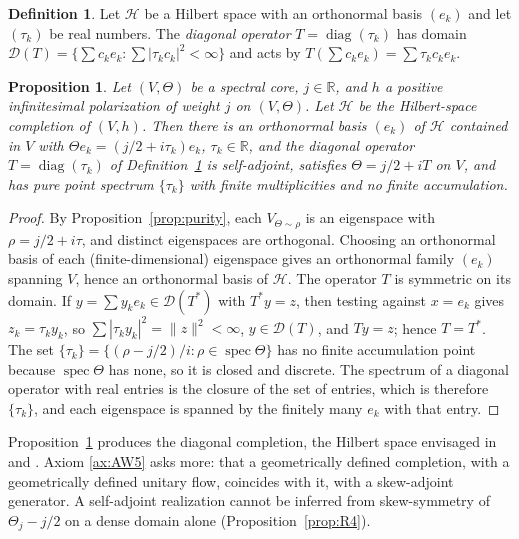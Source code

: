 \documentclass[11pt]{amsart}
\theoremstyle{plain}
\newtheorem{proposition}[theorem]{Proposition}
\theoremstyle{definition}
\newtheorem{definition}[theorem]{Definition}
\theoremstyle{remark}
\numberwithin{equation}{section}
\newcommand{\R}{\mathbb{R}}
\newcommand{\cH}{\mathscr{H}}
\DeclareMathOperator{\spec}{spec}
\DeclareMathOperator{\diag}{diag}
\begin{document}
\begin{definition}\label{def:diag-op}
Let $\cH$ be a Hilbert space with an orthonormal basis $(e_k)$ and let
$(\tau_k)$ be real numbers. The \emph{diagonal operator}
$T=\diag(\tau_k)$ has domain
$\mathcal D(T)=\{\sum c_ke_k:\sum|\tau_kc_k|^2<\infty\}$ and acts by
$T(\sum c_ke_k)=\sum\tau_kc_ke_k$.
\end{definition}

\begin{proposition}\label{prop:hilbert}
Let $(V,\Theta)$ be a spectral core, $j\in\R$, and $h$ a positive
infinitesimal polarization of weight $j$ on $(V,\Theta)$. Let $\cH$
be the Hilbert-space completion of $(V,h)$. Then there is an orthonormal
basis $(e_k)$ of $\cH$ contained in $V$ with $\Theta e_k=(j/2+i\tau_k)
e_k$, $\tau_k\in\R$, and the diagonal operator $T=\diag(\tau_k)$ of
Definition~\ref{def:diag-op} is self-adjoint, satisfies $\Theta=j/2+iT$
on $V$, and has pure point spectrum $\{\tau_k\}$ with finite
multiplicities and no finite accumulation.
\end{proposition}

\begin{proof}
By Proposition~\ref{prop:purity}, each $V_{\Theta\sim\rho}$ is an
eigenspace with $\rho=j/2+i\tau$, and distinct eigenspaces are
orthogonal. Choosing an orthonormal basis of each (finite-dimensional)
eigenspace gives an orthonormal family $(e_k)$ spanning $V$, hence an
orthonormal basis of $\cH$. The operator $T$ is symmetric on its domain.
If $y=\sum y_ke_k\in\mathcal D(T^*)$ with $T^*y=z$, then testing against
$x=e_k$ gives $z_k=\tau_ky_k$, so $\sum|\tau_ky_k|^2=\|z\|^2<\infty$,
$y\in\mathcal D(T)$, and $Ty=z$; hence $T=T^*$. The set
$\{\tau_k\}=\{(\rho-j/2)/i:\rho\in\spec\Theta\}$ has no finite
accumulation point because $\spec\Theta$ has none, so it is closed and
discrete. The spectrum of a diagonal operator with real entries is the
closure of the set of entries, which is therefore $\{\tau_k\}$, and each
eigenspace is spanned by the finitely many $e_k$ with that entry.
\end{proof}

Proposition~\ref{prop:hilbert} produces the diagonal completion, the
Hilbert space envisaged in \cite[p.~33]{Deninger1994Motivic} and
\cite[p.~169]{Deninger1998Analogies}. Axiom
\ref{ax:AW5} asks more: that a geometrically defined completion, with a
geometrically defined unitary flow, coincides with it, with a
skew-adjoint generator. A self-adjoint realization cannot be inferred
from skew-symmetry of $\Theta_j-j/2$ on a dense domain alone
(Proposition~\ref{prop:R4}).
\end{document}
